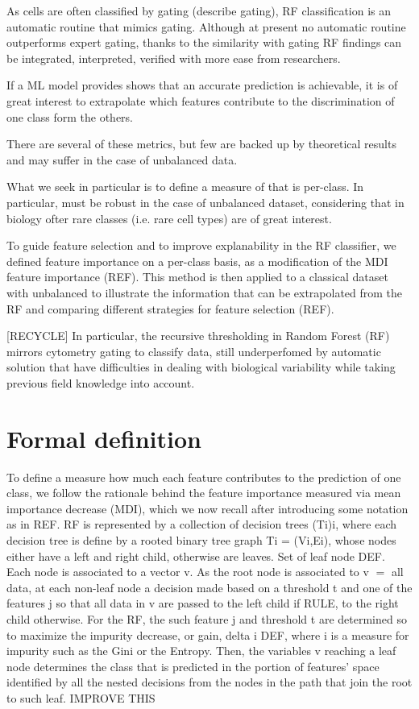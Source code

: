 \documentclass[12pt,a4paper]{article}
\theoremstyle{definition}
\theoremstyle{plain}
\theoremstyle{remark}
\begin{document}
As cells are often classified by gating (describe gating), RF classification is an automatic routine that mimics gating. Although at present no automatic routine outperforms expert gating, thanks to the similarity with gating RF findings can be integrated, interpreted, verified with more ease from researchers.

If a ML model provides shows that an accurate prediction is achievable, it is of great interest to extrapolate which features contribute to the discrimination of one class form the others.  

There are several of these metrics, but few are backed up by theoretical results and may suffer in the case of unbalanced data.

What we seek in particular is to define a measure of that is per-class. In particular, must be robust in the case of unbalanced dataset, considering that in biology ofter rare classes (i.e. rare cell types) are of great interest.

To guide feature selection and to improve explanability in the RF classifier, we defined feature importance on a per-class basis, as a modification of the MDI feature importance (REF). This method is then applied to a classical dataset with unbalanced to illustrate the information that can be extrapolated from the RF and comparing different strategies for feature selection (REF).




[RECYCLE] In particular, the recursive thresholding in Random Forest (RF) mirrors cytometry gating to classify data, still underperfomed by automatic solution that have difficulties in dealing with biological variability while taking previous field knowledge into account.



\section{Formal definition}\label{sec:conv_stat}
To define a measure how much each feature contributes to the prediction of one class, we follow the rationale behind the feature importance measured via mean importance decrease (MDI), which we now recall after introducing some notation as in REF.
RF is represented by a collection of decision trees (Ti)i, where each decision tree is define by a rooted binary tree graph Ti = (Vi,Ei), whose nodes either have a left and right child, otherwise are leaves. Set of leaf node DEF. 
Each node is associated to a vector v.
As the root node is associated to v $=$ all data, at each non-leaf node a decision made based on a threshold t and one of the features j so that all data in v are passed to the left child if RULE, to the right child otherwise.
For the RF, the such feature j and threshold t are determined so to maximize the impurity decrease, or gain,
delta i DEF,
where i is a measure for impurity such as the Gini or the Entropy.
Then, the variables v reaching a leaf node determines the class that is predicted in the portion of features' space identified by all the nested decisions from the nodes in the path that join the root to such leaf. IMPROVE THIS
\end{document}
